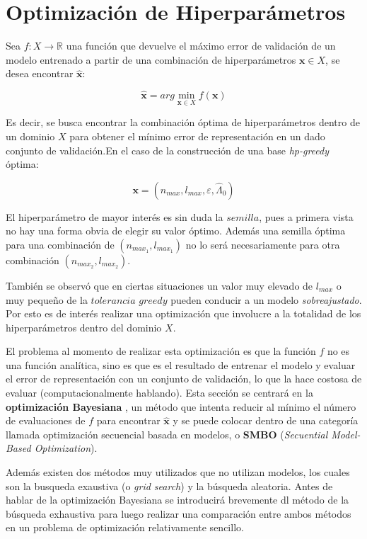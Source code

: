 \section{Optimización de Hiperparámetros}

Sea $f: X \rightarrow \mathbb{R}$ una función que devuelve el máximo error de validación de un modelo entrenado a partir de una combinación de hiperparámetros $\textbf{x} \in X$, se desea encontrar $\hat{\textbf{x}}$:

\[
\hat{\textbf{x}} = arg \min_{\textbf{x} \in X} f(\textbf{x})
\]

Es decir, se busca encontrar la combinación óptima de hiperparámetros dentro de un dominio $X$ para obtener el mínimo error de representación en un dado conjunto de validación.En el caso de la construcción de una base \textit{hp-greedy} óptima: 

\[
\textbf{x} = (n_{max}, l_{max}, \varepsilon, \hat{\Lambda}_0)
\]

El hiperparámetro de mayor interés es sin duda la $semilla$, pues a primera vista no hay una forma obvia de elegir su valor óptimo. Además una semilla óptima para una combinación de $(n_{max_1}, l_{max_1})$ no lo será necesariamente para otra combinación $(n_{max_2}, l_{max_2})$.

También se observó que en ciertas situaciones un valor muy elevado de $l_{max}$ o muy pequeño de la $tolerancia$ $greedy$ pueden conducir a un modelo \textit{sobreajustado}. Por esto es de interés realizar una optimización que involucre a la totalidad de los hiperparámetros dentro del dominio $X$. 


El problema al momento de realizar esta optimización es que la función $f$ no es una función analítica, sino es que es el resultado de entrenar el modelo y evaluar el error de representación con un conjunto de validación, lo que la hace costosa de evaluar (computacionalmente hablando). Esta sección se centrará en la \textbf{optimización Bayesiana} \cite{7352306, https://doi.org/10.48550/arxiv.1012.2599}, un método que intenta reducir al mínimo el número de evaluaciones de $f$ para encontrar $\hat{\textbf{x}}$ y se puede colocar dentro de una categoría llamada optimización secuencial basada en modelos, o \textbf{SMBO}\cite{dewancker2015bayesian,NIPS2011_86e8f7ab} (\textit{Secuential Model-Based Optimization}).


Además existen dos métodos muy utilizados que no utilizan modelos, los cuales son la busqueda exaustiva (o \textit{grid search}) y la búsqueda aleatoria. Antes de hablar de la optimización Bayesiana se introducirá brevemente dl método de la búsqueda exhaustiva para luego realizar una comparación entre ambos métodos en un problema de optimización relativamente sencillo.


